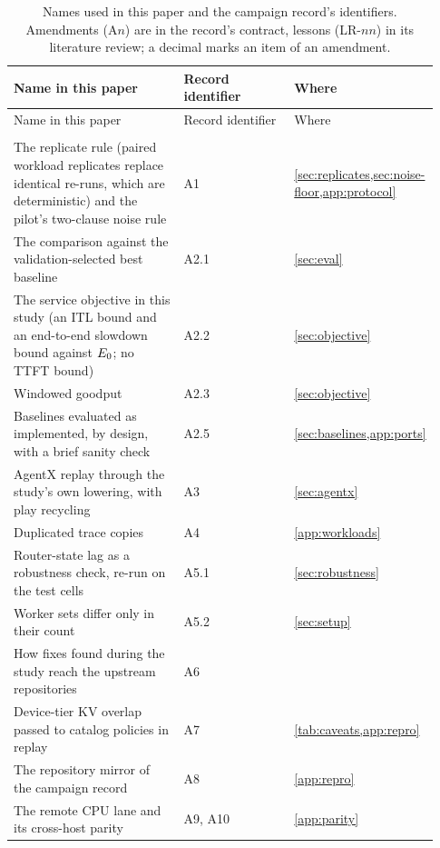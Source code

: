 {\small
\setlength{\LTcapwidth}{\linewidth}
\begin{longtable}{@{}P{0.42\linewidth}P{0.27\linewidth}P{0.24\linewidth}@{}}
\caption{Names used in this paper and the campaign record's identifiers. Amendments (A$n$) are in
  the record's contract, lessons (LR-$nn$) in its literature review; a decimal marks an item of an
  amendment.}\label{tab:provenance}\\
\toprule
Name in this paper & Record identifier & Where \\
\midrule
\endfirsthead
\toprule
Name in this paper & Record identifier & Where \\
\midrule
\endhead
\bottomrule
\endfoot
{} \\*
The replicate rule (paired workload replicates replace identical re-runs, which are deterministic)
  and the pilot's two-clause noise rule & A1 & \cref{sec:replicates,sec:noise-floor,app:protocol} \\
The comparison against the validation-selected best baseline & A2.1 & \cref{sec:eval} \\
The service objective in this study (an ITL bound and an end-to-end slowdown bound against
  $E_0$; no TTFT bound) & A2.2 & \cref{sec:objective} \\
Windowed goodput & A2.3 & \cref{sec:objective} \\
Baselines evaluated as implemented, by design, with a brief sanity check & A2.5 &
  \cref{sec:baselines,app:ports} \\
AgentX replay through the study's own lowering, with play recycling & A3 & \cref{sec:agentx} \\
Duplicated trace copies & A4 & \cref{app:workloads} \\
Router-state lag as a robustness check, re-run on the test cells & A5.1 & \cref{sec:robustness} \\
Worker sets differ only in their count & A5.2 & \cref{sec:setup} \\
How fixes found during the study reach the upstream repositories & A6 & \\
Device-tier KV overlap passed to catalog policies in replay & A7 & \cref{tab:caveats,app:repro} \\
The repository mirror of the campaign record & A8 & \cref{app:repro} \\
The remote CPU lane and its cross-host parity & A9, A10 & \cref{app:parity} \\

\end{longtable}}

